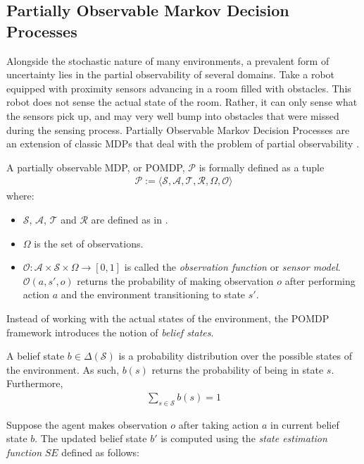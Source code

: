 \subsection{Partially Observable Markov Decision Processes}
\label{sec:pomdp}
Alongside the stochastic nature of many environments, a prevalent form of uncertainty lies in the partial observability of several domains. Take a robot equipped with proximity sensors advancing in a room filled with obstacles. This robot does not sense the actual state of the room. Rather, it can only sense what the sensors pick up, and may very well bump into obstacles that were missed during the sensing process. Partially Observable Markov Decision Processes are an extension of classic MDPs that deal with the problem of partial observability \cite{Russell:2009:AIM:1671238}.
\begin{definition}
A partially observable MDP, or POMDP, $\mathcal{P}$ is formally defined as a tuple
\begin{align*}
    \mathcal{P} := \big \langle \mathcal{S}, \mathcal{A}, \mathcal{T}, \mathcal{R}, \Omega, \mathcal{O} \big \rangle
  \end{align*}
where:
\begin{itemize}
    \item $\mathcal{S}$, $\mathcal{A}$, $\mathcal{T}$ and $\mathcal{R}$ are defined as in .
    \item $\Omega$ is the set of observations.
    \item $\mathcal{O} : \mathcal{A} \times \mathcal{S} \times \Omega \rightarrow [0,1]$ is called the \textit{observation function} or \textit{sensor model}. $\mathcal{O}(a,s',o)$ returns the probability of making observation $o$ after performing action $a$ and the environment transitioning to state $s'$.
\end{itemize}
\end{definition}
Instead of working with the actual states of the environment, the POMDP framework introduces the notion of \textit{belief states}.
\begin{definition}
A belief state $b \in \Delta(\mathcal{S})$ is a probability distribution over the possible states of the environment. As such, $b(s)$ returns the probability of being in state $s$. Furthermore,
\begin{align*}
    \sum_{s \in \mathcal{S}} b(s) = 1
\end{align*}
\end{definition}
Suppose the agent makes observation $o$ after taking action $a$ in current belief state $b$. The updated belief state $b'$ is computed using the \textit{state estimation function} $SE$ defined as follows:
